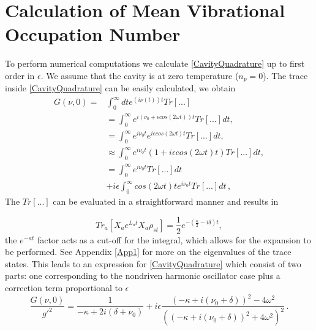 \documentclass[reprint, amsmath,amssymb, aps,pra]{revtex4-1}
\begin{document}
\section{Calculation of Mean Vibrational Occupation Number}\label{NumCal}

To perform numerical computations we calculate
\eqref{CavityQuadrature} up to first order in $\epsilon$. We assume
that the cavity is at zero temperature ($n_p=0$).  The trace inside
\eqref{CavityQuadrature} can be easily calculated, we obtain
\begin{align}
G(\nu,0)=&\int_0^\infty dt e^{(i\nu(t)) t}Tr[...]\nonumber\\
&= \int_0^\infty e^{i(\nu_0 + \epsilon cos(2\omega t) )t} Tr[...]dt, \nonumber\\
&=\int_0^\infty e^{i \nu_0 t}e^{i \epsilon cos(2\omega t)t} Tr[...]dt, \nonumber\\
&\approx \int_0^\infty e^{i \nu_0 t}(1+i \epsilon cos(2\omega t)t) Tr[...]dt, \nonumber\\
&=\int_0^\infty e^{i \nu_0 t}Tr[...]dt\nonumber\\
&+i\epsilon\int_0^\infty cos(2\omega t)t e^{i \nu_0 t}Tr[...]dt\, ,\nonumber
\end{align}The $Tr[...]$ can be evaluated in a straightforward manner and results in

\begin{equation}
Tr_a[X_a e^{L_a t} X_a \rho_{st}] = \frac{1}{2}e^{-(\frac{\kappa}{2}-i\delta) t},
\end{equation} the $e^{-\kappa t}$ factor acts as a cut-off for the integral, which allows for the expansion to be performed. See Appendix \ref{App1} for more on the eigenvalues of the trace states.
This leads to an expression for \eqref{CavityQuadrature} which consist
of two parts: one corresponding to the nondriven harmonic oscillator
case plus a correction term proportional to $\epsilon$
\begin{equation}
\frac{G(\nu,0)}{g'^2}= \frac{1}{-\kappa + 2i(\delta + \nu_0)} +i\epsilon\frac{(-\kappa + i(\nu_0 + \delta))^2 - 4\omega^2}{((-\kappa + i(\nu_0 + \delta))^2 + 4\omega^2)^2}\, .
\end{equation} %
\end{document}
